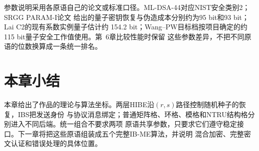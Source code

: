 参数说明采用各原语自己的论文或标准口径。ML-DSA-44对应NIST安全类别2；SRGG PARAM-I论文
给出的量子密钥恢复与伪造成本分别约为95 bit和93 bit；Lai C2的现有系数实例量子估计约
154.2 bit；Wang--PW目标档按项目确定的约115 bit量子安全工作值使用。第~6章比较性能时保留
这些参数差异，不把不同原语的位数换算成一条统一排名。

\section{本章小结}

本章给出了作品的理论与算法坐标。两层HIBE沿$(r,s)$路径控制随机种子的恢复，IBS把发送身份
与协议消息绑定；普通矩阵格、环格、模格和NTRU结构格分别进入不同后端。统一组合不要求两项
原语共享参数，只要求它们遵守稳定接口。下一章将把这些原语组装成五个完整IB-ME算法，并说明
混合加密、完整密文认证和错误处理的具体位置。
